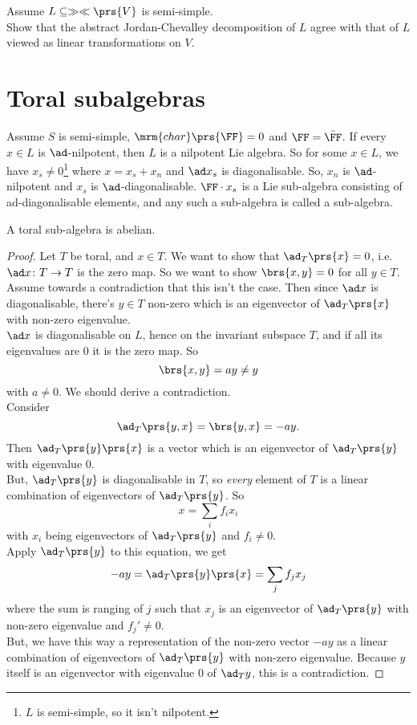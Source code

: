 \documentclass[10pt,a4paper,twoside,openany,hidelinks]{book}
\begin{document}
\begin{exercise}
Assume $L \subseteq \gg \ll \prs{V}$ is semi-simple.\\
Show that the abstract Jordan-Chevalley decomposition of $L$ agree with that of $L$ viewed as linear transformations on $V$.
\end{exercise}

\chapter{Toral subalgebras}
Assume $S$ is semi-simple, $\mrm{char}\prs{\FF} = 0$ and $\FF =\bar{\FF}$.
If every $x \in L$ is $\ad$-nilpotent, then $L$ is a nilpotent Lie algebra. So for some $x \in L$, we have $x_s \neq 0$\footnote{$L$ is semi-simple, so it isn't nilpotent.} where $x = x_s + x_n$ and $\ad x_s$ is diagonalisable. So, $x_n$ is $\ad$-nilpotent and $x_s$ is $\ad$-diagonalisable.
$\FF \cdot x_s$ is a Lie sub-algebra consisting of ad-diagonalisable elements, and any such a sub-algebra is called a  sub-algebra.

\begin{theorem}
A toral sub-algebra is abelian.
\end{theorem}
\begin{proof}
Let $T$ be toral, and $x \in T$. We want to show that $\ad_T\prs{x} = 0$, i.e. $\ad x \colon T \to T$ is the zero map. So we want to show $\brs{x,y} = 0$ for all $y \in T$.\\
Assume towards a contradiction that this isn't the case. Then since $\ad x$ is diagonalisable, there's $y \in T$ non-zero which is an eigenvector of $\ad_T\prs{x}$ with non-zero eigenvalue.\\
$\ad x$ is diagonalisable on $L$, hence on the invariant subspace $T$, and if all its eigenvalues are $0$ it is the zero map. So
\[\brs{x,y} = ay \neq y\]
with $a \neq 0$.
We should derive a contradiction.\\
Consider \[\ad_T\prs{y,x} = \brs{y,x} = -ay\text{.}\]
Then $\ad_T\prs{y}\prs{x}$ is a vector which is an eigenvector of $\ad_T\prs{y}$ with eigenvalue $0$.\\
But, $\ad_T\prs{y}$ is diagonalisable in $T$, so \emph{every} element of $T$ is a linear combination of eigenvectors of $\ad_T\prs{y}$. So \[x = \sum_{i} f_i x_i\] with $x_i$ being eigenvectors of $\ad_T\prs{y}$ and $f_i \neq 0$.\\
Apply $\ad_T\prs{y}$ to this equation, we get
\[-ay = \ad_T\prs{y} \prs{x} = \sum_j f_j x_j\]
where the sum is ranging of $j$ such that $x_j$ is an eigenvector of $\ad_T\prs{y}$ with non-zero eigenvalue and $f_j' \neq 0$.\\
But, we have this way a representation of the non-zero vector $-ay$ as a linear combination of eigenvectors of $\ad_{T}\prs{y}$ with non-zero eigenvalue. Because $y$ itself is an eigenvector with eigenvalue $0$ of $\ad_T y$, this is a contradiction.
\end{proof}
\end{document}
